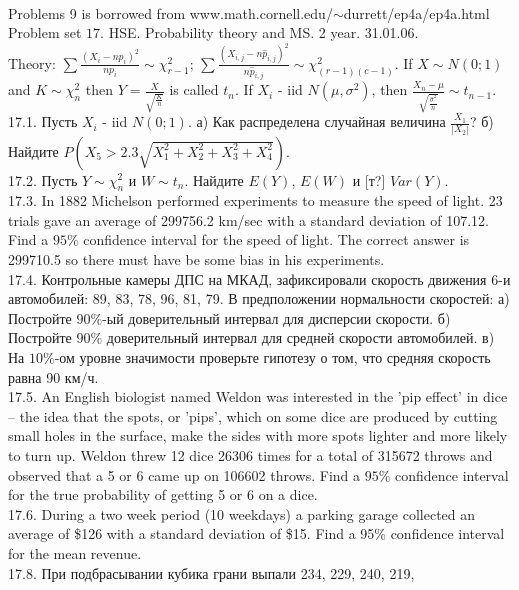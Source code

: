 \documentclass[pdftex,12pt,a4paper]{article}
\begin{document}
\\
Problems 9 is borrowed from www.math.cornell.edu/$\sim$durrett/ep4a/ep4a.html \\
\newpage
Problem set $17$. HSE. Probability theory and MS. 2 year. 31.01.06.\\
Theory: $\sum \frac{(X_{i}-n p_{i})^{2}}{n p_{i}}\sim
\chi_{r-1}^{2}$; $\sum \frac{(X_{i,j}-n
\hat{p}_{i,j})^{2}}{n\hat{p}_{i,j}}\sim \chi_{(r-1)(c-1)}^{2}$. If
$X\sim N(0;1)$ and $K\sim \chi_{n}^{2}$ then
$Y=\frac{X}{\sqrt{\frac{K}{n}}}$ is called $t_{n}$.  If $X_{i}$ -
iid $N(\mu,\sigma^2)$, then
$\frac{X_{n}-\mu}{\sqrt{\frac{\hat{\sigma}^2}{n}}}\sim t_{n-1}$. \\
17.1. Пусть $X_{i}$ - iid $N(0;1)$. а) Как распределена случайная
величина $\frac{X_{1}}{|X_{2}|}$? б) Найдите
$P\left(X_{5}>2.3\sqrt{X_{1}^{2}+X_{2}^{2}+X_{3}^{2}+X_{4}^{2}}\right)$.
\\
17.2. Пусть $Y\sim \chi_{n}^{2}$ и $W\sim t_{n}$. Найдите $E(Y)$,
$E(W)$ и [т?] $Var(Y)$. \\
17.3. In 1882 Michelson performed experiments to measure the speed
of light. 23 trials gave an average of 299756.2 km/sec with a
standard deviation of 107.12. Find a $95\%$ confidence interval
for the speed of light. The correct answer is 299710.5 so there
must have be some bias in his experiments. \\
17.4. Контрольные камеры ДПС на МКАД, зафиксировали скорость
движения 6-и автомобилей: 89, 83, 78, 96, 81, 79. В предположении
нормальности скоростей: а) Постройте $90\%$-ый доверительный
интервал для дисперсии скорости. б) Постройте $90\%$ доверительный
интервал для средней скорости автомобилей. в) На $10\%$-ом уровне
значимости проверьте гипотезу о том, что
средняя скорость равна 90 км/ч. \\
17.5. An English biologist named Weldon was interested in the 'pip
effect' in dice – the idea that the spots, or 'pips', which on
some dice are produced by cutting small holes in the surface, make
the sides with more spots lighter and more likely to turn up.
Weldon threw 12 dice 26306 times for a total of 315672 throws and
observed that a 5 or 6 came up on 106602 throws. Find a $95\%$
confidence interval for the true probability of getting 5
or 6 on a dice. \\
17.6. During a two week period (10 weekdays) a parking garage
collected an average of \$126 with a standard deviation of \$15.
Find a 95\% confidence interval for the mean revenue. \\
17.8. При подбрасывании кубика грани выпали 234, 229, 240, 219,
\end{document}
